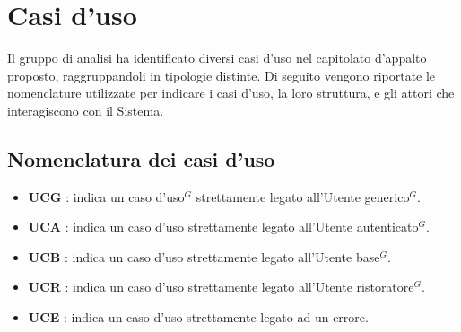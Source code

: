 \section{Casi d'uso}

Il gruppo di analisi ha identificato diversi casi d'uso nel capitolato d'appalto proposto, raggruppandoli in tipologie distinte. 
Di seguito vengono riportate le nomenclature utilizzate per indicare i casi d'uso, la loro struttura, e gli attori che interagiscono con il Sistema.

\subsection{Nomenclatura dei casi d'uso}
\begin{itemize}
	\item \textbf{UCG} : indica un caso d'uso$^G$ strettamente legato all'Utente generico$^G$.
	\item \textbf{UCA} : indica un caso d'uso strettamente legato all'Utente autenticato$^G$.
	\item \textbf{UCB} : indica un caso d'uso strettamente legato all'Utente base$^G$.
	\item \textbf{UCR} : indica un caso d'uso strettamente legato all'Utente ristoratore$^G$.
	\item \textbf{UCE} : indica un caso d'uso strettamente legato ad un errore.
\end{itemize}
